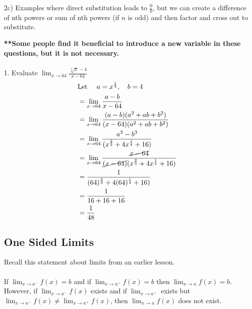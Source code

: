 \documentclass{article}
\begin{document}
2c) Examples where direct substitution leads to $\frac{0}{0}$, but we can create a difference of nth powers or sum of nth powers (if $n$ is odd) and then factor and cross out to substitute.

\textbf{**Some people find it beneficial to introduce a new variable in these questions, but it is not necessary.}\\\\
1. Evaluate $\lim_{x \to 64}\frac{\sqrt[3]{x}-4}{x-64}$
\begin{align*}
    & \text{Let }\quad a=x^\frac{1}{3}, \quad b=4\\
    &=\lim_{x \to 64}\frac{a-b}{x-64}\\
    &=\lim_{x \to 64}\frac{(a-b)(a^2+ab+b^2)}{(x-64)(a^2+ab+b^2)}\\
    &=\lim_{x \to 64}\frac{a^3-b^3}{(x^{\frac{2}{3}}+4x^{\frac{1}{4}}+16)}\\
    &=\lim_{x \to 64}\frac{\cancel{x-64}}{\cancel{(x-64)}(x^{\frac{2}{3}}+4x^{\frac{1}{4}}+16)}\\
    &=\frac{1}{(64)^{\frac{2}{3}}+4(64)^{\frac{1}{4}}+16)}\\
    &=\frac{1}{16+16+16}\\
    &=\frac{1}{48}
\end{align*}
\newpage
\subsection{One Sided Limits}
Recall this statement about limits from an earlier lesson.\\\\
If $\lim_{x\to a^-}f(x)=b$ and if $\lim_{x\to a^+}f(x)=b$ then $\lim_{x\to a}f(x)=b$.\\
However, if $\lim_{x \to a^{-}}f(x)$ exists and if $\lim_{x \to a^+}$ exists but $\lim_{x \to a^-}f(x)\neq \lim_{x \to a^+}f(x)$, then $\lim_{x \to a}f(x)$ does not exist.
\end{document}
